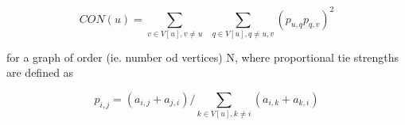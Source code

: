 \documentclass[10pt,singlespace]{article}
\begin{document}
$$CON(u) = \sum_{v \in V[u], v \neq u} \;\; \sum_{q\in V[u],  q\neq u,v} \left(p_{u,q} p_{q,v} \right)^2$$

for a graph of order (ie. number od vertices) N, where proportional tie strengths are defined as

$$p_{i,j}=(a_{i,j}+a_{j,i}) / \sum_{k \in V[u], k\neq i} (a_{i,k}+a_{k,i})$$
\end{document}
